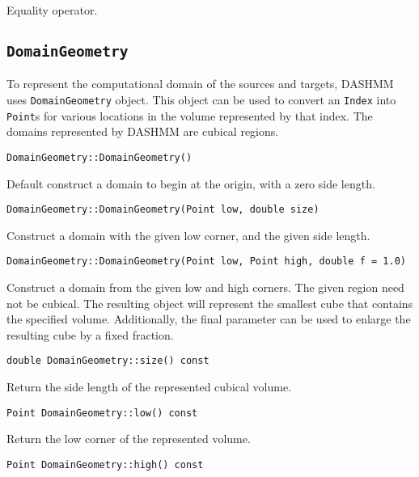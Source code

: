 \noindent Equality operator.


\subsection{\texttt{DomainGeometry}}

To represent the computational domain of the sources and targets, DASHMM
uses \texttt{DomainGeometry} object. This object can be used to convert
an \texttt{Index} into \texttt{Point}s for various locations in the volume
represented by that index. The domains represented by DASHMM are cubical
regions.

\begin{lstlisting}
DomainGeometry::DomainGeometry()
\end{lstlisting}

\noindent Default construct a domain to begin at the origin, with a zero
side length.

\begin{lstlisting}
DomainGeometry::DomainGeometry(Point low, double size)
\end{lstlisting}

\noindent Construct a domain with the given low corner, and the given side
length.

\begin{lstlisting}
DomainGeometry::DomainGeometry(Point low, Point high, double f = 1.0)
\end{lstlisting}

\noindent Construct a domain from the given low and high corners. The given
region need not be cubical. The resulting object will represent the smallest
cube that contains the specified volume. Additionally, the final parameter can
be used to enlarge the resulting cube by a fixed fraction.

\begin{lstlisting}
double DomainGeometry::size() const
\end{lstlisting}

\noindent Return the side length of the represented cubical volume.

\begin{lstlisting}
Point DomainGeometry::low() const
\end{lstlisting}

\noindent Return the low corner of the represented volume.

\begin{lstlisting}
Point DomainGeometry::high() const
\end{lstlisting}

